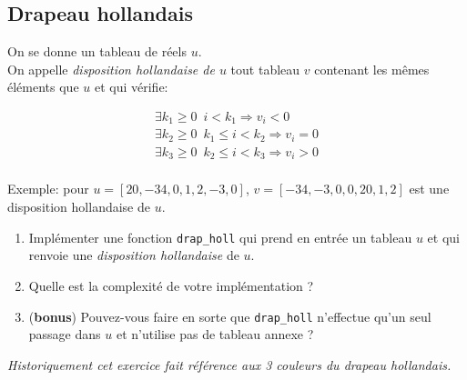 \subsection{Drapeau hollandais}

On se donne un tableau de réels $u$. \\
On appelle \textit{disposition hollandaise de $u$} tout tableau $v$ contenant les mêmes éléments que $u$ et qui vérifie:

\begin{align*}
\exists k_{1} \geq 0 \enspace  i < k_{1} \Rightarrow v_i < 0 \\
\exists k_{2} \geq 0 \enspace  k_{1} \leq i < k_2 \Rightarrow v_i = 0 \\
\exists k_{3} \geq 0 \enspace  k_{2} \leq i < k_{3} \Rightarrow v_i > 0 \\
\end{align*}

Exemple: pour $u=[20,-34,0,1,2,-3,0]$, $v=[-34,-3,0,0,20,1,2]$ est une disposition hollandaise de $u$.

\begin{enumerate}
\item Implémenter une fonction \texttt{drap\_holl} qui prend en entrée un tableau $u$ et qui renvoie une \textit{disposition hollandaise} de $u$.
\item Quelle est la complexité de votre implémentation ?
\item (\textbf{bonus}) Pouvez-vous faire en sorte que \texttt{drap\_holl} n'effectue qu'un seul passage dans $u$ et n'utilise pas de tableau annexe ?
\end{enumerate}

\textit{Historiquement cet exercice fait référence aux 3 couleurs du drapeau hollandais.}
